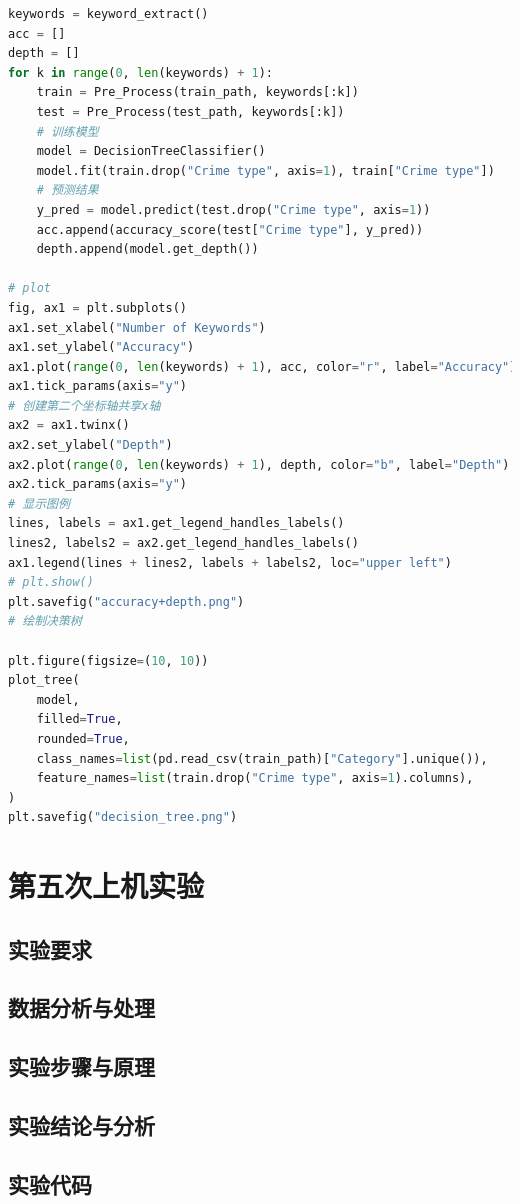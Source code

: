 \documentclass[a4paper,12pt]{report}
\begin{document}
\begin{lstlisting}[language=Python]
keywords = keyword_extract()
acc = []
depth = []
for k in range(0, len(keywords) + 1):
    train = Pre_Process(train_path, keywords[:k])
    test = Pre_Process(test_path, keywords[:k])
    # 训练模型
    model = DecisionTreeClassifier()
    model.fit(train.drop("Crime type", axis=1), train["Crime type"])
    # 预测结果
    y_pred = model.predict(test.drop("Crime type", axis=1))
    acc.append(accuracy_score(test["Crime type"], y_pred))
    depth.append(model.get_depth())

# plot
fig, ax1 = plt.subplots()
ax1.set_xlabel("Number of Keywords")
ax1.set_ylabel("Accuracy")
ax1.plot(range(0, len(keywords) + 1), acc, color="r", label="Accuracy")
ax1.tick_params(axis="y")
# 创建第二个坐标轴共享x轴
ax2 = ax1.twinx()
ax2.set_ylabel("Depth")
ax2.plot(range(0, len(keywords) + 1), depth, color="b", label="Depth")
ax2.tick_params(axis="y")
# 显示图例
lines, labels = ax1.get_legend_handles_labels()
lines2, labels2 = ax2.get_legend_handles_labels()
ax1.legend(lines + lines2, labels + labels2, loc="upper left")
# plt.show()
plt.savefig("accuracy+depth.png")
# 绘制决策树

plt.figure(figsize=(10, 10))
plot_tree(
    model,
    filled=True,
    rounded=True,
    class_names=list(pd.read_csv(train_path)["Category"].unique()),
    feature_names=list(train.drop("Crime type", axis=1).columns),
)
plt.savefig("decision_tree.png")

\end{lstlisting}
\clearpage
\chapter{第五次上机实验}
\section{实验要求}
\section{数据分析与处理}
\section{实验步骤与原理}
\section{实验结论与分析}
\section{实验代码}
\printbibliography
\end{document}

